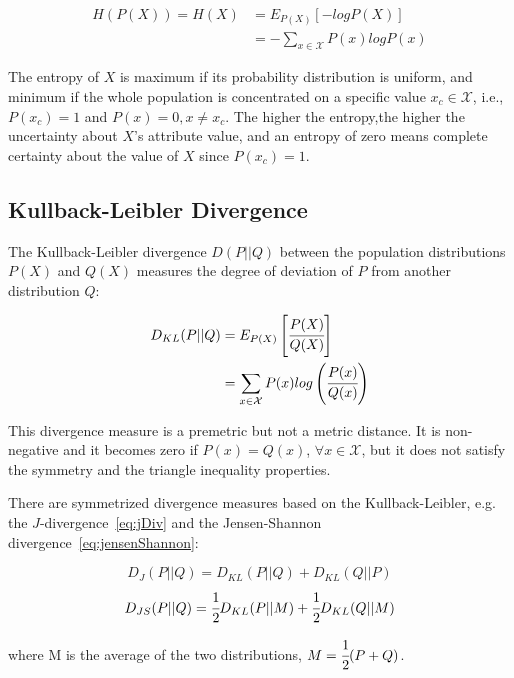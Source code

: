 \begin{equation}
\begin{split}
 H(P(X))=H(X)&=E_{P(X)}[-logP(X)] \\
 &=-\sum_{x \in \mathcal{X}}P(x)logP(x)
\end{split} 
\end{equation}

The entropy of $X$ is maximum if its probability distribution is uniform, and minimum if the whole population is
concentrated on a specific value $x_c \in \mathcal{X}$, i.e., $P(x_c)=1$ and $P(x)=0, x \neq x_c$. The higher the
entropy,the higher the uncertainty about $X$'s attribute value, and an entropy of zero means complete certainty about
the value of $X$ since $P(x_c)=1$.

\subsection{Kullback-Leibler Divergence}

The Kullback-Leibler divergence $D(P||Q)$ between the population distributions $P(X)$ and $Q(X)$ measures the degree
of deviation of $P$ from another distribution $Q$:

\begin{equation}
\begin{split}
 D_{KL}(P||Q)&=E_{P(X)}\left[\cfrac{P(X)}{Q(X)}\right] \\
 &=\sum_{x \in \mathcal{X}}P(x)log\left(\cfrac{P(x)}{Q(x)}\right)
\end{split} 
\end{equation}

This divergence measure is a premetric but not a metric distance. It is non-negative and it becomes zero if
$P(x)=Q(x)$,
$\forall x \in \mathcal{X}$, but it does not satisfy the symmetry and the triangle inequality properties.

There are symmetrized divergence measures based on the Kullback-Leibler, e.g. the $J$-divergence~\ref{eq:jDiv} and the
Jensen-Shannon divergence~\ref{eq:jensenShannon}:

\begin{equation} \label{eq:jDiv}
  D_{J}(P||Q) = D_{KL}(P||Q) + D_{KL}(Q||P)
\end{equation}
\begin{equation} \label{eq:jensenShannon}
  D_{JS}(P||Q) = \cfrac{1}{2}D_{KL}(P||M) + \cfrac{1}{2}D_{KL}(Q||M)
\end{equation}

where M is the average of the two distributions, $M=\cfrac{1}{2}(P+Q)$.

